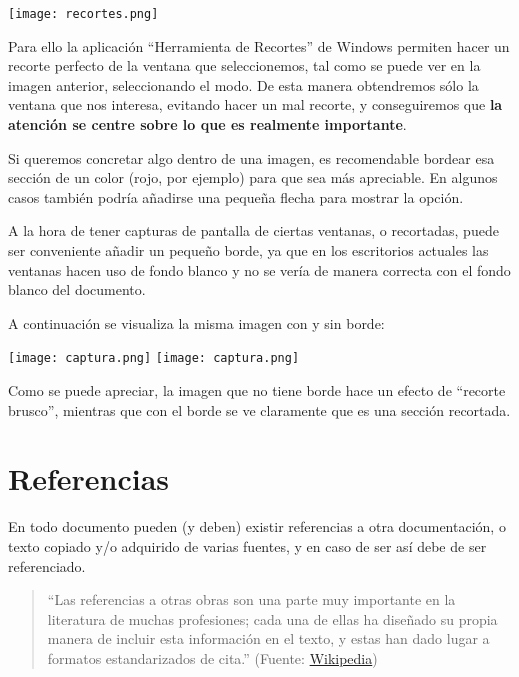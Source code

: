 \begin{center}
    \texttt{[image: recortes.png]}
\end{center}

Para ello la aplicación “Herramienta de Recortes” de Windows permiten hacer un recorte perfecto de la ventana que seleccionemos, tal como se puede ver en la imagen anterior, seleccionando el modo. De esta manera obtendremos sólo la ventana que nos interesa, evitando hacer un mal recorte,  y conseguiremos que \textbf{la atención se centre sobre lo que es realmente importante}.

Si queremos concretar algo dentro de una imagen, es recomendable bordear esa sección de un color (rojo, por ejemplo) para que sea más apreciable. En algunos casos también podría añadirse una pequeña flecha para mostrar la opción.

A la hora de tener capturas de pantalla de ciertas ventanas, o recortadas, puede ser conveniente añadir un pequeño borde, ya que en los escritorios actuales las ventanas hacen uso de fondo blanco y no se vería de manera correcta con el fondo blanco del documento.

A continuación se visualiza la misma imagen con y sin borde:

\begin{center}
    \texttt{[image: captura.png]}
    \hfill
    \texttt{[image: captura.png]}
\end{center}

Como se puede apreciar, la imagen que no tiene borde hace un efecto de “recorte brusco”, mientras que con el borde se ve claramente que es una sección recortada.



\chapter{Referencias}
En todo documento pueden (y deben) existir referencias a otra documentación, o texto copiado y/o adquirido de varias fuentes, y en caso de ser así debe de ser referenciado.

\vspace{-10pt}
\begin{quote}
    “Las referencias a otras obras son una parte muy importante en la literatura de muchas profesiones; cada una de ellas ha diseñado su propia manera de incluir esta información en el texto, y estas han dado lugar a formatos estandarizados de cita.” (Fuente: \href{https://es.wikipedia.org/wiki/Wikipedia:Referencias}{Wikipedia})
\end{quote}


